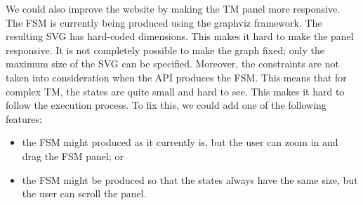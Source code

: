 We could also improve the website by making the TM panel more responsive. The FSM is currently being produced using the graphviz framework. The resulting SVG has hard-coded dimensions. This makes it hard to make the panel responsive. It is not completely possible to make the graph fixed; only the maximum size of the SVG can be specified. Moreover, the constraints are not taken into consideration when the API produces the FSM. This means that for complex TM, the states are quite small and hard to see. This makes it hard to follow the execution process. To fix this, we could add one of the following features:
\begin{itemize}
    \item the FSM might produced as it currently is, but the user can zoom in and drag the FSM panel; or
    \item the FSM might be produced so that the states always have the same size, but the user can scroll the panel. 
\end{itemize}
